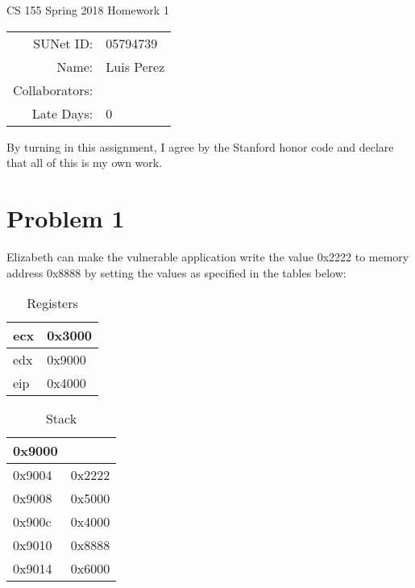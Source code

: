 \documentclass[12pt]{article}
\begin{document}
\begin{center}
{\Large CS 155 Spring 2018 Homework 1}

\begin{tabular}{rl}
SUNet ID: & 05794739 \\
Name: & Luis Perez \\
Collaborators: & \\
Late Days: & 0
\end{tabular}
\end{center}

By turning in this assignment, I agree by the Stanford honor code and declare
that all of this is my own work.

\section*{Problem 1}
Elizabeth can make the vulnerable application write the value 0x2222 to memory address 0x8888 by setting the values as specified in the tables below:

\begin{table}[!h]
\centering
\caption{Registers}
\label{table:registers}
\begin{tabular}{|l|l|}
\hline
ecx & 0x3000 \\ \hline
edx & 0x9000 \\ \hline
eip & 0x4000 \\ \hline
\end{tabular}
\end{table}

\begin{table}[!h]
\centering
\caption{Stack}
\label{table:stack}
\begin{tabular}{|l|l|}
\hline
0x9000 &        \\ \hline
0x9004 & 0x2222 \\ \hline
0x9008 & 0x5000 \\ \hline
0x900c & 0x4000 \\ \hline
0x9010 & 0x8888 \\ \hline
0x9014 & 0x6000 \\ \hline
\end{tabular}
\end{table}
\end{document}
